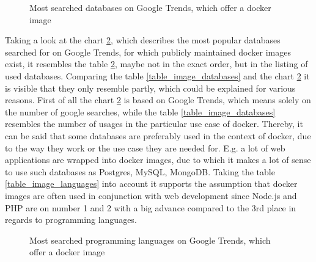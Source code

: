 \begin{figure}[H]
    \centering
    \def\stackalignment{r}
    \caption{Most searched databases on Google Trends, which offer a docker image}
    \label{fig:databases_top_ranking}
\end{figure}

Taking a look at the chart \ref{fig:databases_top_ranking}, which describes the most popular databases searched for on Google Trends, for which publicly maintained docker images exist, it resembles the table \ref{fig:databases_top_ranking}, maybe not in the exact order, but in the listing of used databases.
Comparing the table \ref{table_image_databases} and the chart \ref{fig:databases_top_ranking} it is visible that they only resemble partly, which could be explained for various reasons. First of all the chart \ref{fig:databases_top_ranking} is based on Google Trends, which means solely on the number of google searches, while the table \ref{table_image_databases} resembles the number of usages in the particular use case of docker. Thereby, it can be said that some databases are preferably used in the context of docker, due to the way they work or the use case they are needed for. E.g. a lot of web applications are wrapped into docker images, due to which it makes a lot of sense to use such databases as Postgres, MySQL, MongoDB. Taking the table \ref{table_image_languages} into account it supports the assumption that docker images are often used in conjunction with web development since Node.js and PHP are on number 1 and 2 with a big advance compared to the 3rd place in regards to programming languages.

\begin{figure}[H]
    \centering
    \def\stackalignment{r}
    \caption{Most searched programming languages on Google Trends, which offer a docker image}
    \label{fig:databases_top_ranking}
\end{figure}

